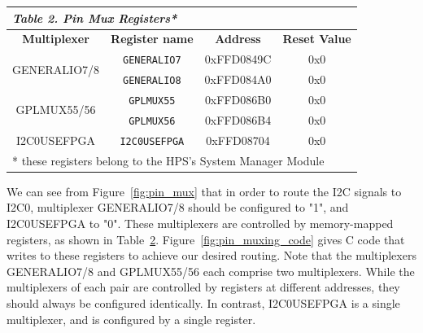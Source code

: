 \documentclass[11pt, twoside, pdftex]{article}
\begin{document}
\begin{table}[h]
    \centering
    \begin{tabular}{|c|c|c|c|}
        \hline
        \multicolumn{4}{|l|}{\textit{\textbf{Table 2. Pin Mux Registers*}}}
        \\\hline
            \textbf{Multiplexer}
            & \textbf{Register name}
            & \textbf{Address}
            & \textbf{Reset Value}
        \\\hline
            \multirow{2}{*}{GENERALIO7/8}
            & \texttt{GENERALIO7}
            & 0xFFD0849C
            & 0x0
        \\
            & \texttt{GENERALIO8}
            & 0xFFD084A0
            & 0x0
        \\\hline
            \multirow{2}{*}{GPLMUX55/56}
            & \texttt{GPLMUX55}
            & 0xFFD086B0
            & 0x0
        \\
            & \texttt{GPLMUX56}
            & 0xFFD086B4
            & 0x0
        \\\hline
            I2C0USEFPGA
            & \texttt{I2C0USEFPGA}
            & 0xFFD08704
            & 0x0
        \\\hline
        \multicolumn{4}{|l|}{* these registers belong to the HPS's System Manager Module}
        \\\hline
    \end{tabular}
    \label{tab:pinmux_registers}
\end{table}
We can see from Figure~\ref{fig:pin_mux} that in order to route the I2C signals to I2C0, multiplexer GENERALIO7/8 should be configured to "1", and I2C0USEFPGA to "0". These multiplexers are controlled by memory-mapped registers, as shown in Table~\hyperref[tab:pinmux_registers]{2}.  Figure~\ref{fig:pin_muxing_code} gives C code that writes to these registers to achieve our desired routing. Note that the multiplexers GENERALIO7/8 and GPLMUX55/56 each comprise two multiplexers. While the multiplexers of each pair are controlled by registers at different addresses, they should always be configured identically. In contrast, I2C0USEFPGA is a single multiplexer, and is configured by a single register.

\end{document}
